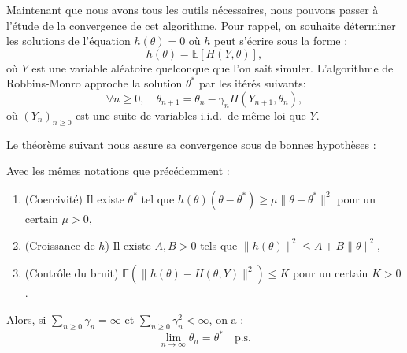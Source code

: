 

Maintenant que nous avons tous les outils nécessaires, nous pouvons passer à l'étude
de la convergence de cet algorithme.
Pour rappel, on souhaite déterminer les solutions de l'équation $h(\theta) = 0$ où $h$ peut s'écrire sous la forme :
    \[ h(\theta) = \mathbb{E}[H(Y, \theta)], \]
où $Y$ est une variable aléatoire quelconque que l'on sait simuler.
L'algorithme de Robbins-Monro approche la solution $\theta^*$ par les itérés suivants:
    \[ \forall n \geq 0, \quad \theta_{n+1} = \theta_n - \gamma_n H(Y_{n+1}, \theta_n),\]
où $(Y_n)_{n \geq 0}$ est une suite de variables i.i.d.\ de même loi que $Y$.

Le théorème suivant nous assure sa convergence sous de bonnes hypothèses :

\begin{theorem}
    Avec les mêmes notations que précédemment :
    \begin{enumerate}[label=\roman*)]
        \item (Coercivité) Il existe $\theta^*$ tel que $h(\theta)(\theta - \theta^*) \geq \mu \|\theta - \theta^*\|^2$ pour un certain $\mu > 0$,
        \item (Croissance de $h$) Il existe $A, B > 0$ tels que $\|h(\theta)\|^2 \leq A + B \|\theta\|^2$,
        \item (Contrôle du bruit) $\mathbb{E}(\|h(\theta) - H(\theta, Y)\|^2) \leq K$ pour un certain $K > 0$.
    \end{enumerate}
    Alors, si $\sum_{n \geq 0} \gamma_n = \infty$ et $\sum_{n \geq 0} \gamma_n^2 < \infty$, on a :
        \[ \lim_{n \to \infty} \theta_n = \theta^* \quad \text{p.s.}\]
\end{theorem}

